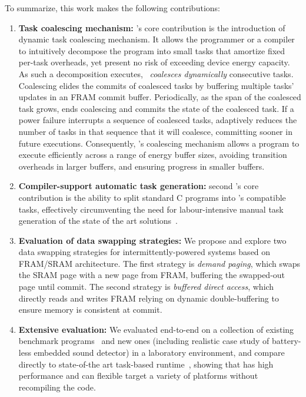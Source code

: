 To summarize, this work makes the following contributions:
%
\begin{enumerate}
%
\item {\bf Task coalescing mechanism:} \sys's core contribution is the introduction of dynamic task coalescing mechanism. It allows the programmer or a compiler to intuitively decompose the program into small tasks that amortize fixed per-task overheads, yet present no risk of exceeding device energy capacity. As such a decomposition executes, \sys~{\em coalesces dynamically} consecutive tasks. Coalescing elides the commits of coalesced tasks by buffering multiple tasks' updates in an FRAM commit buffer. Periodically, as the span of the coalesced task grows, \sys ends coalescing and commits the state of the coalesced task. If a power failure interrupts a sequence of coalesced tasks, \sys adaptively reduces the number of tasks in that sequence that it will coalesce, committing sooner in future executions. Consequently, \sys's coalescing mechanism allows a program to execute efficiently across a range of energy buffer sizes, avoiding transition overheads in larger buffers, and ensuring progress in smaller buffers.
%

\item {\bf Compiler-support automatic task generation:} second \sys's core contribution is the ability to split standard C programs into \sys's compatible tasks, effectively circumventing the need for labour-intensive manual task generation of the state of the art solutions~\cite{chain,alpaca}.
%
%
\item {\bf Evaluation of data swapping strategies:} We propose and explore two data swapping strategies for intermittently-powered systems based on FRAM/SRAM architecture. The first strategy is {\em demand paging}, which swaps the SRAM page with a new page from FRAM, buffering the swapped-out page until commit. The second strategy is {\em buffered direct access}, which directly reads and writes FRAM relying on dynamic double-buffering to ensure memory is consistent at
commit. 
%
%
\item {\bf Extensive \sys evaluation:} We evaluated \sys end-to-end on a collection of existing benchmark programs~\cite[Sec. 5]{chain} and new ones (including realistic case study of battery-less embedded sound detector) in a laboratory environment, and compare directly to state-of-the art task-based runtime~\cite{chain}, showing that \sys has high performance and can flexible target a variety of platforms without recompiling the code. 
%
%
\end{enumerate}
